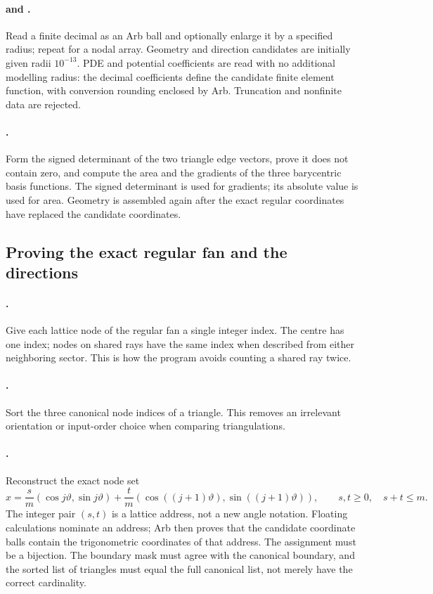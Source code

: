 \paragraph{ and .}
Read a finite decimal as an Arb ball and optionally enlarge it by a
specified radius; repeat for a nodal array. Geometry and direction
candidates are initially given radii $10^{-13}$. PDE and potential
coefficients are read with no additional modelling radius: the decimal
coefficients define the candidate finite element function, with conversion
rounding enclosed by Arb. Truncation and nonfinite data are rejected.

\paragraph{.}
Form the signed determinant of the two triangle edge vectors, prove it
does not contain zero, and compute the area and the gradients of the three
barycentric basis functions. The signed determinant is used for gradients;
its absolute value is used for area. Geometry is assembled again after
the exact regular coordinates have replaced the candidate coordinates.

\subsection{Proving the exact regular fan and the directions}
\paragraph{.}
Give each lattice node of the regular fan a single integer index. The
centre has one index; nodes on shared rays have the same index when
described from either neighboring sector. This is how the program avoids
counting a shared ray twice.

\paragraph{.}
Sort the three canonical node indices of a triangle. This removes an
irrelevant orientation or input-order choice when comparing triangulations.

\paragraph{.}
Reconstruct the exact node set
\[
 x=\frac{s}{m}(\cos j\vartheta,\sin j\vartheta)
   +\frac{t}{m}(\cos((j+1)\vartheta),\sin((j+1)\vartheta)),
 \qquad s,t\geq0,\quad s+t\leq m.
\]
The integer pair $(s,t)$ is a lattice address, not a new angle notation.
Floating calculations nominate an address; Arb then proves that the
candidate coordinate balls contain the trigonometric coordinates of that
address. The assignment must be a bijection. The boundary mask must agree
with the canonical boundary, and the sorted list of triangles must equal
the full canonical list, not merely have the correct cardinality.

